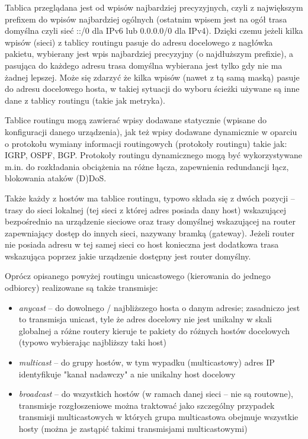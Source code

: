 Tablica przeglądana jest od wpisów najbardziej precyzyjnych, czyli z największym prefixem do wpisów najbardziej ogólnych (ostatnim wpisem jest na ogół trasa domyślna czyli sieć ::/0 dla IPv6 lub 0.0.0.0/0 dla IPv4). Dzięki czemu jeżeli kilka wpisów (sieci) z tablicy routingu pasuje do adresu docelowego z nagłówka pakietu, wybierany jest wpis najbardziej precyzyjny (o najdłuższym prefixie), a pasująca do każdego adresu trasa domyślna wybierana jest tylko gdy nie ma żadnej lepszej. Może się zdarzyć że kilka wpisów (nawet z tą samą maską) pasuje do adresu docelowego hosta, w takiej sytuacji do wyboru ścieżki używane są inne dane z tablicy routingu (takie jak metryka).

Tablice routingu mogą zawierać wpisy dodawane statycznie (wpisane do konfiguracji danego urządzenia), jak też wpisy dodawane dynamicznie w oparciu o protokołu wymiany informacji routingowych (protokoły routingu) takie jak: IGRP, OSPF, BGP. Protokoły routingu dynamicznego mogą być wykorzystywane m.in. do rozkładania obciążenia na różne łącza, zapewnienia redundancji łącz, blokowania ataków (D)DoS.

Także każdy z hostów ma tablice routingu, typowo składa się z dwóch pozycji – trasy do sieci lokalnej (tej sieci z której adres posiada dany host) wskazującej bezpośrednio na urządzenie sieciowe oraz trasy domyślnej wskazującej na router zapewniający dostęp do innych sieci, nazywany bramką (gateway). Jeżeli router nie posiada adresu w tej samej sieci co host konieczna jest dodatkowa trasa wskazująca poprzez jakie urządzenie dostępny jest router domyślny.

Oprócz opisanego powyżej routingu unicastowego (kierowania do jednego odbiorcy) realizowane są także transmisje:
\begin{itemize}
	\item \emph{anycast} – do dowolnego / najbliższego hosta o danym adresie; zasadniczo jest to transmisja unicast, tyle że adres docelowy nie jest unikalny w skali globalnej a różne routery kieruje te pakiety do różnych hostów docelowych (typowo wybierając najbliższy taki host)
	\item \emph{multicast} – do grupy hostów, w tym wypadku (multicastowy) adres IP identyfikuje "kanał nadawczy" a nie unikalny host docelowy
	\item \emph{broadcast} – do wszystkich hostów (w ramach danej sieci – nie są routowne), transmisje rozgłoszeniowe można traktować jako szczególny przypadek transmisji multicastowych w których grupa multicastowa obejmuje wszystkie hosty (można je zastąpić takimi transmisjami multicastowymi)
\end{itemize}

